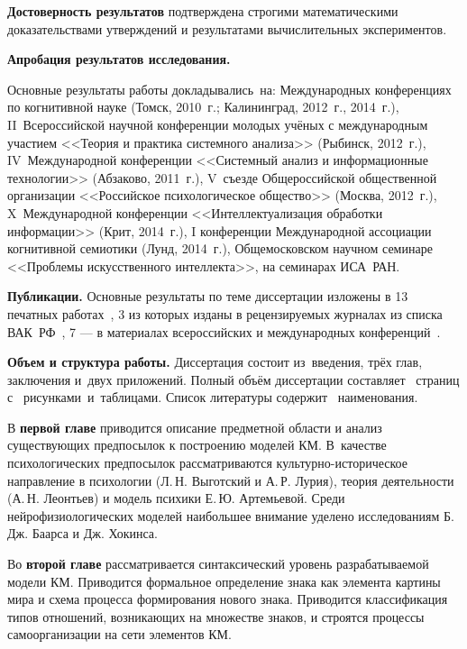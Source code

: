 \textbf{Достоверность результатов} подтверждена строгими математическими доказательствами утверждений и результатами вычислительных экспериментов.

\textbf{Апробация результатов исследования.}

Основные результаты работы докладывались~на: Международных конференциях по когнитивной науке (Томск, 2010~г.; Калининград, 2012~г., 2014~г.), II~Всероссийской научной конференции молодых учёных с международным участием <<Теория и практика системного анализа>> (Рыбинск, 2012~г.), IV~Международной конференции <<Системный анализ и информационные технологии>> (Абзаково, 2011~г.), V~съезде Общероссийской общественной организации <<Российское психологическое общество>> (Москва, 2012~г.), X~Международной конференции <<Интеллектуализация обработки информации>> (Крит, 2014~г.), I конференции Международной ассоциации когнитивной семиотики (Лунд, 2014~г.), Общемосковском научном семинаре <<Проблемы искусственного интеллекта>>, на семинарах ИСА~РАН.

\textbf{Публикации.} Основные результаты по теме диссертации изложены в 13 печатных работах~\cite{PanovA2011,PanovA2012a,PanovA2012b,PanovA2012c,PanovA2013b,PanovA2014a,PanovT2010b,PanovT2012a,PanovT2012b,PanovT2013,PanovT2014a,PanovT2014b,PanovA2014c,PanovAE2014a}, 3 из которых изданы в рецензируемых журналах из списка ВАК~РФ~\cite{PanovA2012c,PanovA2013b,PanovA2014a}, 7 --- в материалах всероссийских и международных конференций~\cite{PanovA2011,PanovA2012a,PanovA2012b,PanovT2010b,PanovT2012b,PanovT2014a,PanovT2014b}.

\textbf{Объем и структура работы.} Диссертация состоит из~введения, трёх глав, заключения и~двух приложений. Полный объём диссертации составляет \totalpages\ страниц с \totalfigures\ рисунками\iftotaltables\ и\totaltables\ таблицами\fi. Список литературы содержит \totalcitnums\ наименования.

В \textbf{первой главе} приводится описание предметной области и анализ существующих предпосылок к построению моделей КМ. В~качестве психологических предпосылок рассматриваются культурно-историческое направление в психологии (Л.\,Н. Выготский и А.\,Р. Лурия), теория деятельности (А.\,Н. Леонтьев) и модель психики Е.\,Ю. Артемьевой. Среди нейрофизиологических моделей наибольшее внимание уделено исследованиям Б.\,Дж. Баарса и Дж. Хокинса.

Во \textbf{второй главе} рассматривается синтаксический уровень разрабатываемой модели КМ. Приводится формальное определение знака как элемента картины мира и схема процесса формирования нового знака. Приводится классификация типов отношений, возникающих на множестве знаков, и строятся процессы самоорганизации на сети элементов КМ.

